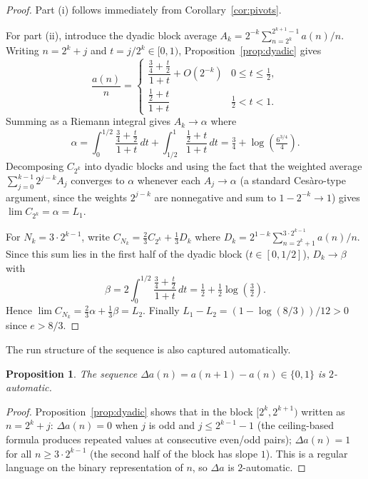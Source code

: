 \documentclass[12pt]{article}
\newtheorem{proposition}[theorem]{Proposition}
\theoremstyle{definition}
\theoremstyle{remark}
\begin{document}
\begin{proof}
  Part (i) follows immediately from Corollary~\ref{cor:pivots}.

  For part (ii), introduce the dyadic block average
  $A_k = 2^{-k}\sum_{n=2^k}^{2^{k+1}-1} a(n)/n$.
  Writing $n=2^k+j$ and $t=j/2^k\in[0,1)$, Proposition~\ref{prop:dyadic} gives
  \[
    \frac{a(n)}{n} =
    \begin{cases}
      \dfrac{\tfrac{3}{4}+\tfrac{t}{2}}{1+t} + O(2^{-k}) & 0\le t\le \tfrac{1}{2},\\[8pt]
      \dfrac{\tfrac{1}{2}+t}{1+t}                         & \tfrac{1}{2}<t<1.
    \end{cases}
  \]
  Summing as a Riemann integral gives $A_k\to\alpha$ where
  \[
    \alpha = \int_0^{1/2}\frac{\tfrac{3}{4}+\tfrac{t}{2}}{1+t}\,dt
           + \int_{1/2}^1  \frac{\tfrac{1}{2}+t}{1+t}\,dt
           = \tfrac{3}{4}+\log\!\left(\tfrac{6^{3/4}}{4}\right).
  \]
  Decomposing $C_{2^k}$ into dyadic blocks and using the fact that
  the weighted average $\sum_{j=0}^{k-1} 2^{j-k} A_j$ converges to $\alpha$
  whenever each $A_j\to\alpha$ (a standard Cesàro-type argument,
  since the weights $2^{j-k}$ are nonnegative and sum to $1-2^{-k}\to 1$)
  gives $\lim C_{2^k}=\alpha=L_1$.

  For $N_k=3\cdot 2^{k-1}$, write
  $C_{N_k} = \frac{2}{3}C_{2^k} + \frac{1}{3}D_k$
  where $D_k = 2^{1-k}\sum_{n=2^k+1}^{3\cdot 2^{k-1}} a(n)/n$.
  Since this sum lies in the first half of the dyadic block ($t\in[0,1/2]$),
  $D_k\to\beta$ with
  \[
    \beta = 2\int_0^{1/2}\frac{\tfrac{3}{4}+\tfrac{t}{2}}{1+t}\,dt
          = \tfrac{1}{2}+\tfrac{1}{2}\log\!\left(\tfrac{3}{2}\right).
  \]
  Hence $\lim C_{N_k} = \frac{2}{3}\alpha+\frac{1}{3}\beta = L_2$.
  Finally $L_1-L_2 = (1-\log(8/3))/12 > 0$ since $e>8/3$.
\end{proof}

The run structure of the sequence is also captured automatically.

\begin{proposition}
  The sequence $\Delta a(n) = a(n+1)-a(n) \in \{0,1\}$ is $2$-automatic.
\end{proposition}

\begin{proof}
  Proposition~\ref{prop:dyadic} shows that in the block $[2^k, 2^{k+1})$
  written as $n=2^k+j$:
  $\Delta a(n)=0$ when $j$ is odd and $j\le 2^{k-1}-1$
  (the ceiling-based formula produces repeated values at consecutive even/odd pairs);
  $\Delta a(n)=1$ for all $n\ge 3\cdot 2^{k-1}$ (the second half of the block
  has slope $1$).
  This is a regular language on the binary representation of $n$, so
  $\Delta a$ is $2$-automatic.
\end{proof}
\end{document}
